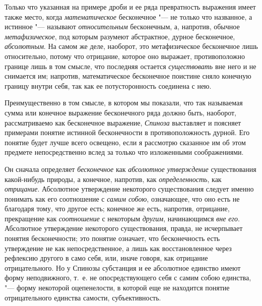 Только что указанная на примере дроби и ее ряда превратность выражения имеет
также место, когда {\em математическое} бесконечное
"--- не только что названное, а истинное "--- называют
{\em относительным} бесконечным, а, напротив, обычное
{\em метафизическое}, под которым разумеют абстрактное,
дурное бесконечное, {\em абсолютным}. На самом же деле,
наоборот, это метафизическое бесконечное лишь относительно, потому что
отрицание, которое оно выражает, противоположно границе лишь в том смысле,
что последняя остается {\em существовать} вне него и не
снимается им; напротив, математическое бесконечное поистине сняло конечную
границу внутри себя, так как ее потусторонность соединена с нею.

Преимущественно в том смысле, в котором мы показали, что так называемая
сумма или конечное выражение бесконечного ряда должно быть, наоборот,
рассматриваемо как бесконечное выражение, {\em Спиноза}
выставляет и поясняет примерами понятие истинной бесконечности в
противоположность дурной. Его понятие будет лучше всего освещено, если я
рассмотрю сказанное им об этом предмете непосредственно вслед за только что
изложенными соображениями.

Он сначала определяет {\em бесконечное} как
{\em абсолютное утверждение} существования какой-нибудь
природы, а конечное, напротив, как
{\em определенность}, как
{\em отрицание}. Абсолютное утверждение некоторого
существования следует именно понимать как его соотношение с
{\em самим собою}, означающее, что оно есть не
благодаря тому, что другое есть; конечное же есть, напротив, отрицание,
прекращение как {\em соотношение} с некоторым
{\em другим}, начинающимся {\em вне
его}. Абсолютное утверждение некоторого существования, правда, не
исчерпывает понятия бесконечности; это понятие означает, что бесконечность
есть утверждение не как непосредственное, а лишь как восстановленное через
рефлексию другого в само себя, или, иначе говоря, как отрицание
отрицательного. Но у Спинозы субстанция и ее абсолютное единство имеют
форму неподвижного, т.~е. не опосредствующего себя с самим собою единства,
"--- форму некоторой оцепенелости, в которой еще не находится понятие
отрицательного единства самости, субъективность.

